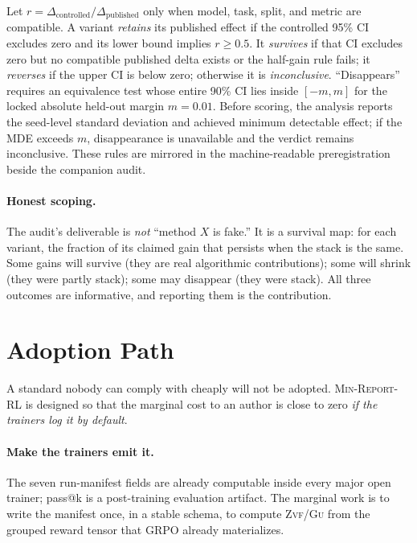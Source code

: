 \documentclass[11pt]{article}
\newcommand{\zvf}{\textsc{Zvf}}
\newcommand{\gu}{\textsc{Gu}}
\newcommand{\minreport}{\textsc{Min-Report-RL}}
\begin{document}
Let $r=\Delta_{\mathrm{controlled}}/\Delta_{\mathrm{published}}$ only when
model, task, split, and metric are compatible. A variant \emph{retains} its
published effect if the controlled 95\% CI excludes zero and its lower bound
implies $r\ge0.5$. It \emph{survives} if that CI excludes zero but no compatible
published delta exists or the half-gain rule fails; it \emph{reverses} if the
upper CI is below zero; otherwise it is \emph{inconclusive}.
``Disappears'' requires an equivalence test whose entire 90\% CI lies inside
$[-m,m]$ for the locked absolute held-out margin $m=0.01$. Before scoring,
the analysis reports the seed-level standard deviation and achieved minimum
detectable effect; if the MDE exceeds $m$, disappearance is unavailable and the
verdict remains inconclusive. These rules are mirrored in the machine-readable
preregistration beside the companion audit.

\paragraph{Honest scoping.}
The audit's deliverable is \emph{not} ``method $X$ is fake.'' It is a survival
map: for each variant, the fraction of its claimed gain that persists when the
stack is the same. Some gains will survive (they are real algorithmic
contributions); some will shrink (they were partly stack); some may disappear
(they were stack). All three outcomes are informative, and reporting them is
the contribution.

\section{Adoption Path}
\label{sec:adoption}

A standard nobody can comply with cheaply will not be adopted. \minreport{} is
designed so that the marginal cost to an author is close to zero \emph{if the
trainers log it by default}.

\paragraph{Make the trainers emit it.}
The seven run-manifest fields are already computable inside every major open
trainer; pass@k is a post-training evaluation artifact. The marginal work is
to write the manifest once, in a stable schema, to compute
\zvf{}/\gu{} from the grouped reward tensor that GRPO already materializes.
\end{document}
